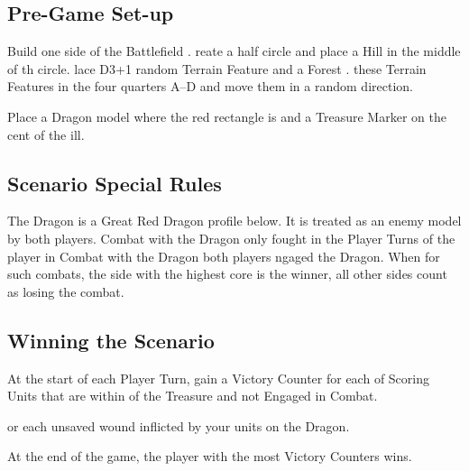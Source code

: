 
\subsection*{Pre-Game Set-up}


Build one side of the Battlefield . reate a half circle and place a Hill in the middle of th circle. lace D3+1 random Terrain Feature and a Forest .  these Terrain Features in the four quarters A--D and move them  in a random direction. 

Place a Dragon model where the red rectangle is and a Treasure Marker on the cent of the ill.

\subsection*{Scenario Special Rules}

The Dragon is a Great Red Dragon profile  below. It is treated as an enemy model by both players.  Combat with the Dragon  only fought in the Player Turns of the player  in Combat with the Dragon both players ngaged  the Dragon. When  for such combats, the side with the highest core is  the  winner,  all other sides count as losing the combat.



\subsection*{Winning the Scenario}

At the start of each Player Turn,  gain a Victory Counter for each of  Scoring Units that are within  of the Treasure  and not Engaged in Combat.

or each unsaved wound inflicted by your units on the Dragon.

At the end of the game, the player with the most Victory Counters wins. 
